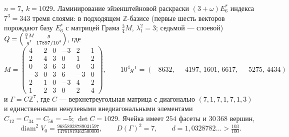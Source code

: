 \documentclass{article}
\newcommand{\Z}{\mathbb{Z}}
\newcommand{\diam}{\operatorname{diam}}
\begin{document}
{\bfseries\boldmath $n=7$, $k=1029$.} Ламинирование эйзенштейновой раскраски
$(3+\omega)E_6^*$ индекса $7^3=343$ тремя слоями: в подходящем $\Z$-базисе
(первые шесть векторов порождают базу $E_6^*$ с матрицей Грама $\tfrac34M$,
$\lambda_1^2=3$; седьмой --- слоевой)
$Q=\Bigl(\begin{smallmatrix}\frac34M&g\\ g^{\mathsf T}&17897/10^4\end{smallmatrix}\Bigr)$,
где
\[
M=\left(\begin{smallmatrix}
4&2&0&-3&2&1\\ 2&4&3&0&1&2\\ 0&3&6&3&0&3\\
-3&0&3&6&-3&0\\ 2&1&0&-3&4&2\\ 1&2&3&0&2&4
\end{smallmatrix}\right),\qquad
10^4g^{\mathsf T}=(-8632,\,-4197,\,1601,\,6617,\,-5275,\,4434)
\]
и $\Gamma=C\Z^7$, где $C$ --- верхнетреугольная матрица с диагональю
$(7,1,7,1,7,1,3)$ и единственными ненулевыми внедиагональными элементами
$C_{12}=C_{34}=C_{56}=-5$; $\det C=1029$. Ячейка имеет $254$ фасеты и
$30\,368$ вершин,
\[
\diam^2V_0=\tfrac{96858928789031597}{14761819462500000},\qquad
D(\Gamma)^2=7,\qquad
d=1{,}0328782\ldots>\tfrac{103}{100}.
\]
\end{document}
